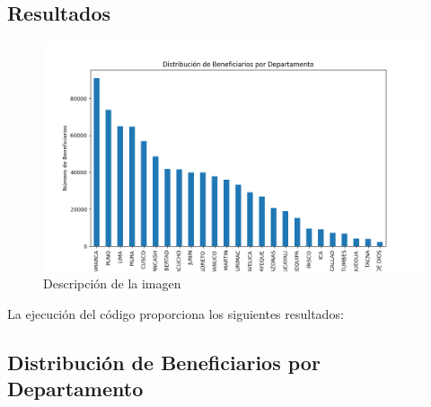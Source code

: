 \documentclass[12pt]{article}
\begin{document}
\subsection*{Resultados}

\begin{figure}[H]
    \centering
    \includegraphics[width=0.9\linewidth]{Figure_1.png}
    \caption{Descripción de la imagen}
    \label{fig:mi-imagen}
\end{figure}



La ejecución del código proporciona los siguientes resultados:

\subsection*{Distribución de Beneficiarios por Departamento}
\end{document}
